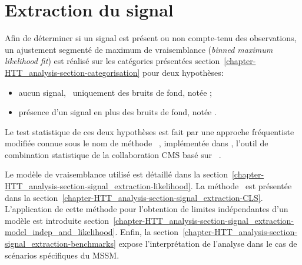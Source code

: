 \section{Extraction du signal}\label{chapter-HTT_analysis-section-signal_extraction}
Afin de déterminer si un signal est présent ou non compte-tenu des observations,
un ajustement segmenté de maximum de vraisemblance (\emph{binned maximum likelihood fit}) est réalisé sur les catégories présentées section~\ref{chapter-HTT_analysis-section-categorisation} pour deux hypothèses:
\begin{itemize}
\item aucun signal, \ie\ uniquement des bruits de fond, notée \hypB;
\item présence d'un signal en plus des bruits de fond, notée \hypSB.
\end{itemize}
Le test statistique de ces deux hypothèses est fait par une approche fréquentiste modifiée connue sous le nom de méthode \CLS~\cite{Junk:1999kv,CLs_method,Read_2002}, implémentée dans \COMBINE, l'outil de combination statistique de la collaboration CMS basé sur \ROOSTATS~\cite{RooStats}.
\par
Le modèle de vraisemblance utilisé est détaillé dans la section~\ref{chapter-HTT_analysis-section-signal_extraction-likelihood}.
La méthode \CLS\ est présentée dans la section~\ref{chapter-HTT_analysis-section-signal_extraction-CLS}.
L'application de cette méthode pour l'obtention de limites indépendantes d'un modèle est introduite section~\ref{chapter-HTT_analysis-section-signal_extraction-model_indep_and_likelihood}.
Enfin, la section~\ref{chapter-HTT_analysis-section-signal_extraction-benchmarks} expose l'interprétation de l'analyse dans le cas de scénarios spécifiques du MSSM.



